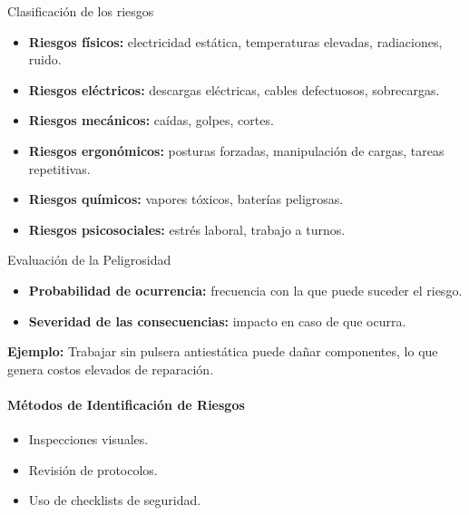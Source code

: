 \documentclass{beamer}
\begin{document}
\begin{frame}{Clasificación de los riesgos}
    \begin{itemize}
        \item \textbf{Riesgos físicos:} electricidad estática, temperaturas elevadas, radiaciones, ruido.
        \item \textbf{Riesgos eléctricos:} descargas eléctricas, cables defectuosos, sobrecargas.
        \item \textbf{Riesgos mecánicos:} caídas, golpes, cortes.
        \item \textbf{Riesgos ergonómicos:} posturas forzadas, manipulación de cargas, tareas repetitivas.
        \item \textbf{Riesgos químicos:} vapores tóxicos, baterías peligrosas.
        \item \textbf{Riesgos psicosociales:} estrés laboral, trabajo a turnos.
    \end{itemize}
\end{frame}



\begin{frame}{Evaluación de la Peligrosidad}
    \begin{itemize}
        \item \textbf{Probabilidad de ocurrencia:} frecuencia con la que puede suceder el riesgo.
        \item \textbf{Severidad de las consecuencias:} impacto en caso de que ocurra.
    \end{itemize}
    \vspace{0.5cm}
    \textbf{Ejemplo:} Trabajar sin pulsera antiestática puede dañar componentes, lo que genera costos elevados de reparación.
    \paragraph{Métodos de Identificación de Riesgos}
    \begin{itemize}
        \item Inspecciones visuales.
        \item Revisión de protocolos.
        \item Uso de checklists de seguridad.
    \end{itemize}
\end{frame}
\end{document}
